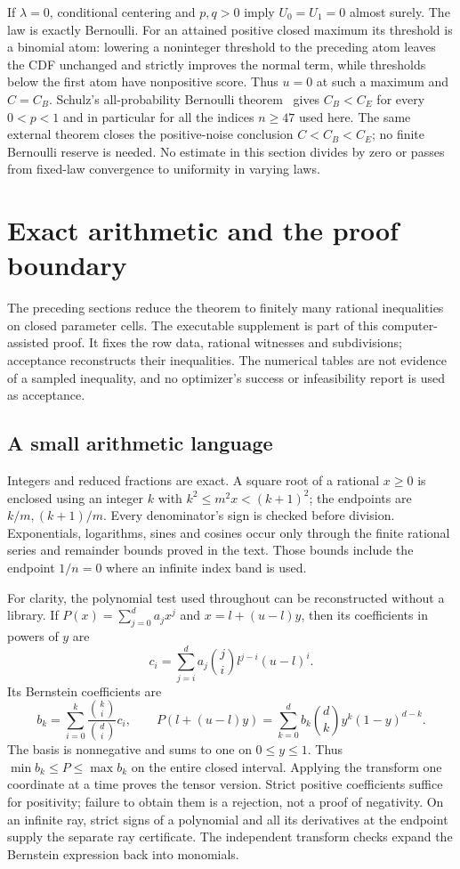 \documentclass[11pt,a4paper]{article}
\numberwithin{equation}{section}
\theoremstyle{definition}
\theoremstyle{remark}
\begin{document}
If $\lambda=0$, conditional centering and $p,q>0$ imply $U_0=U_1=0$
almost surely. The law is exactly Bernoulli. For an attained positive closed
maximum its threshold is a binomial atom: lowering a noninteger threshold
to the preceding atom leaves the CDF unchanged and strictly improves the
normal term, while thresholds below the first atom have nonpositive score.
Thus $u=0$ at such a maximum and $C=C_B$. Schulz's all-probability
Bernoulli theorem~\cite[Theorem~1]{Schulz2016} gives $C_B<C_E$ for every
$0<p<1$ and in particular for all the indices $n\ge47$ used here. The same
external theorem closes the positive-noise conclusion $C<C_B<C_E$; no
finite Bernoulli reserve is needed. No estimate
in this section divides by zero or passes from fixed-law convergence to
uniformity in varying laws.

\section{Exact arithmetic and the proof boundary}\label{cut49:short:arithmetic}

The preceding sections reduce the theorem to finitely many rational
inequalities on closed parameter cells. The executable supplement is
part of this computer-assisted proof. It fixes the row data, rational
witnesses and subdivisions; acceptance reconstructs their inequalities.
The numerical tables are not evidence of a sampled inequality, and
no optimizer's success or infeasibility report is used as acceptance.

\subsection{A small arithmetic language}
Integers and reduced fractions are exact. A square root of a rational
$x\ge0$ is enclosed using an integer $k$ with
$k^2\le m^2x<(k+1)^2$; the endpoints are $k/m,(k+1)/m$.
Every denominator's sign is checked before division. Exponentials,
logarithms, sines and cosines occur only through the finite rational
series and remainder bounds proved in the text. Those bounds include
the endpoint $1/n=0$ where an infinite index band is used.

For clarity, the polynomial test used throughout can be reconstructed
without a library. If $P(x)=\sum_{j=0}^d a_jx^j$ and
$x=l+(u-l)y$, then its coefficients in powers of $y$ are
\[
 c_i=\sum_{j=i}^d a_j\binom ji l^{j-i}(u-l)^i.
\]
Its Bernstein coefficients are
\[
 b_k=\sum_{i=0}^k\frac{\binom ki}{\binom di}c_i,
 \qquad
 P(l+(u-l)y)=\sum_{k=0}^d b_k\binom dk y^k(1-y)^{d-k}.
\]
The basis is nonnegative and sums to one on $0\le y\le1$.
Thus $\min b_k\le P\le\max b_k$ on the entire closed interval.
Applying the transform one coordinate at a time proves the tensor
version. Strict positive coefficients suffice for positivity; failure
to obtain them is a rejection, not a proof of negativity. On an infinite
ray, strict signs of a polynomial and all its derivatives at the endpoint
supply the separate ray certificate. The independent transform checks
expand the Bernstein expression back into monomials.
\end{document}
